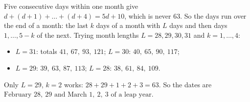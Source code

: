 Five consecutive days within one month give $d+(d+1)+\dots+(d+4)=5d+10$, which is never $63$. So the days run over the end of a month: the last $k$ days of a month with $L$ days and then days $1,\dots,5-k$ of the next. Trying month lengths $L=28,29,30,31$ and $k=1,\dots,4$:
\begin{itemize}
\item $L=31$: totals $41,\ 67,\ 93,\ 121$; \quad $L=30$: $40,\ 65,\ 90,\ 117$;
\item $L=29$: $39,\ 63,\ 87,\ 113$; \quad $L=28$: $38,\ 61,\ 84,\ 109$.
\end{itemize}
Only $L=29$, $k=2$ works: $28+29+1+2+3=63$. So the dates are $\boxed{\text{February }28,\ 29\text{ and March }1,\ 2,\ 3\text{ of a leap year}}$.
